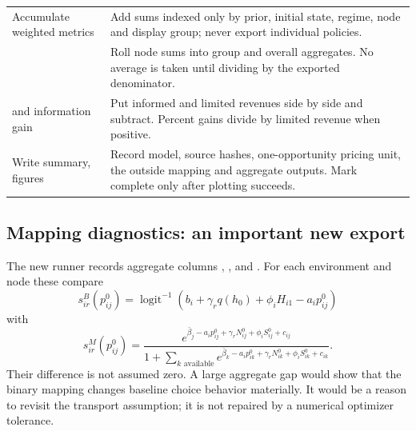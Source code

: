 \documentclass[11pt]{article}
\newcommand{\sig}{\operatorname{logit}^{-1}}
\newcommand{\code}[1]{\texttt{\detokenize{#1}}}
\begin{document}
\begin{longtable}{p{}p{}}
Accumulate weighted metrics & Add sums indexed only by prior, initial state, regime, node and display group; never export individual policies.\\
\code{groupby(...).sum()} & Roll node sums into group and overall aggregates. No average is taken until dividing by the exported denominator.\\
\code{pivot} and information gain & Put informed and limited revenues side by side and subtract. Percent gains divide by limited revenue when positive.\\
Write summary, figures & Record model, source hashes, one-opportunity pricing unit, the outside mapping and aggregate outputs. Mark complete only after plotting succeeds.\\\bottomrule
\end{longtable}

\subsection{Mapping diagnostics: an important new export}
The new runner records aggregate columns
, , and . For each environment and node these compare
\[
 s^{B}_{ir}(p^0_{ij})=\sig(b_i+\gamma_rq(h_0)+\phi_iH_{i1}-a_i p^0_{ij})
\]
with
\[
 s^{M}_{ir}(p^0_{ij})=\frac{e^{\bar\beta_j-a_ip^0_{ij}+\gamma_rN^0_{ij}+\phi_iS^0_{ij}+c_{ij}}}
 {1+\sum_{k\text{ available}} e^{\bar\beta_k-a_ip^0_{ik}+\gamma_rN^0_{ik}+\phi_iS^0_{ik}+c_{ik}}}.
\]
Their difference is not assumed zero. A large aggregate gap would show that the binary mapping changes baseline choice behavior materially. It would be a reason to revisit the transport assumption; it is not repaired by a numerical optimizer tolerance.
\end{document}
